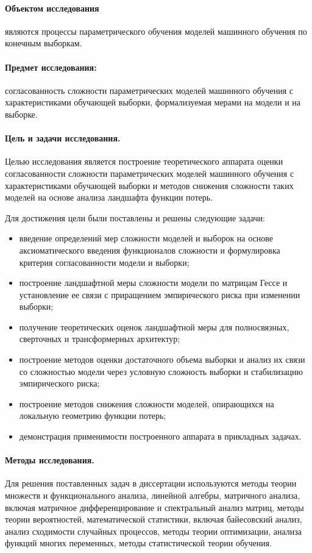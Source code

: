 \paragraph{Объектом исследования} являются процессы параметрического обучения моделей машинного обучения по конечным выборкам.

\paragraph{Предмет исследования:} согласованность сложности параметрических моделей машинного обучения с характеристиками обучающей выборки, формализуемая мерами на модели и на выборке.

\paragraph{Цель и задачи исследования.}
Целью исследования является построение теоретического аппарата оценки согласованности сложности параметрических моделей машинного обучения с характеристиками обучающей выборки и методов снижения сложности таких моделей на основе анализа ландшафта функции потерь.

Для достижения цели были поставлены и решены следующие задачи:
\begin{itemize}
    \item[--] введение определений мер сложности моделей и выборок на основе аксиоматического введения функционалов сложности и формулировка критерия согласованности модели и выборки;
    \item[--] построение ландшафтной меры сложности модели по матрицам Гессе и установление ее связи с приращением эмпирического риска при изменении выборки;
    \item[--] получение теоретических оценок ландшафтной меры для полносвязных, сверточных и трансформерных архитектур;
    \item[--] построение методов оценки достаточного объема выборки и анализ их связи со сложностью модели через условную сложность выборки и стабилизацию эмпирического риска;
    \item[--] построение методов снижения сложности моделей, опирающихся на локальную геометрию функции потерь;
    \item[--] демонстрация применимости построенного аппарата в прикладных задачах.
\end{itemize}

\paragraph{Методы исследования.}
Для решения поставленных задач в диссертации используются методы теории множеств и функционального анализа, линейной алгебры, матричного анализа, включая матричное дифференцирование и спектральный анализ матриц, методы теории вероятностей, математической статистики, включая байесовский анализ, анализ сходимости случайных процессов, методы теории оптимизации, анализа функций многих переменных, методы статистической теории обучения.


